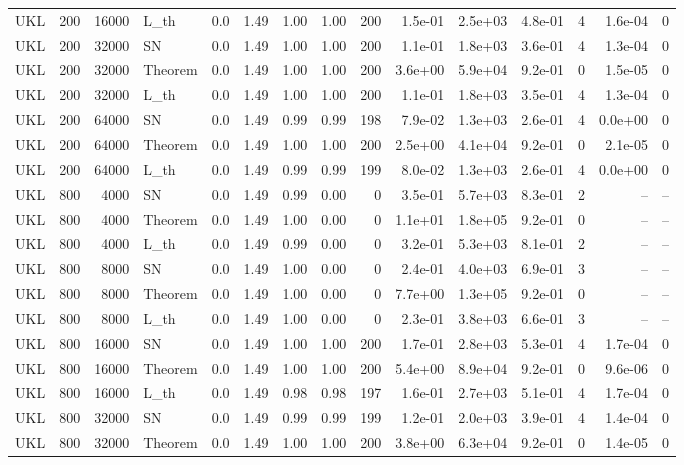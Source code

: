 \begin{tabular}{lrrlrrrrrrrrrrr}
UKL & 200 & 16000 & L\_th & 0.0 & 1.49 & 1.00 & 1.00 & 200 & 1.5e-01 & 2.5e+03 & 4.8e-01 & 4 & 1.6e-04 & 0 \\
UKL & 200 & 32000 & SN & 0.0 & 1.49 & 1.00 & 1.00 & 200 & 1.1e-01 & 1.8e+03 & 3.6e-01 & 4 & 1.3e-04 & 0 \\
UKL & 200 & 32000 & Theorem & 0.0 & 1.49 & 1.00 & 1.00 & 200 & 3.6e+00 & 5.9e+04 & 9.2e-01 & 0 & 1.5e-05 & 0 \\
UKL & 200 & 32000 & L\_th & 0.0 & 1.49 & 1.00 & 1.00 & 200 & 1.1e-01 & 1.8e+03 & 3.5e-01 & 4 & 1.3e-04 & 0 \\
UKL & 200 & 64000 & SN & 0.0 & 1.49 & 0.99 & 0.99 & 198 & 7.9e-02 & 1.3e+03 & 2.6e-01 & 4 & 0.0e+00 & 0 \\
UKL & 200 & 64000 & Theorem & 0.0 & 1.49 & 1.00 & 1.00 & 200 & 2.5e+00 & 4.1e+04 & 9.2e-01 & 0 & 2.1e-05 & 0 \\
UKL & 200 & 64000 & L\_th & 0.0 & 1.49 & 0.99 & 0.99 & 199 & 8.0e-02 & 1.3e+03 & 2.6e-01 & 4 & 0.0e+00 & 0 \\
UKL & 800 & 4000 & SN & 0.0 & 1.49 & 0.99 & 0.00 & 0 & 3.5e-01 & 5.7e+03 & 8.3e-01 & 2 & -- & -- \\
UKL & 800 & 4000 & Theorem & 0.0 & 1.49 & 1.00 & 0.00 & 0 & 1.1e+01 & 1.8e+05 & 9.2e-01 & 0 & -- & -- \\
UKL & 800 & 4000 & L\_th & 0.0 & 1.49 & 0.99 & 0.00 & 0 & 3.2e-01 & 5.3e+03 & 8.1e-01 & 2 & -- & -- \\
UKL & 800 & 8000 & SN & 0.0 & 1.49 & 1.00 & 0.00 & 0 & 2.4e-01 & 4.0e+03 & 6.9e-01 & 3 & -- & -- \\
UKL & 800 & 8000 & Theorem & 0.0 & 1.49 & 1.00 & 0.00 & 0 & 7.7e+00 & 1.3e+05 & 9.2e-01 & 0 & -- & -- \\
UKL & 800 & 8000 & L\_th & 0.0 & 1.49 & 1.00 & 0.00 & 0 & 2.3e-01 & 3.8e+03 & 6.6e-01 & 3 & -- & -- \\
UKL & 800 & 16000 & SN & 0.0 & 1.49 & 1.00 & 1.00 & 200 & 1.7e-01 & 2.8e+03 & 5.3e-01 & 4 & 1.7e-04 & 0 \\
UKL & 800 & 16000 & Theorem & 0.0 & 1.49 & 1.00 & 1.00 & 200 & 5.4e+00 & 8.9e+04 & 9.2e-01 & 0 & 9.6e-06 & 0 \\
UKL & 800 & 16000 & L\_th & 0.0 & 1.49 & 0.98 & 0.98 & 197 & 1.6e-01 & 2.7e+03 & 5.1e-01 & 4 & 1.7e-04 & 0 \\
UKL & 800 & 32000 & SN & 0.0 & 1.49 & 0.99 & 0.99 & 199 & 1.2e-01 & 2.0e+03 & 3.9e-01 & 4 & 1.4e-04 & 0 \\
UKL & 800 & 32000 & Theorem & 0.0 & 1.49 & 1.00 & 1.00 & 200 & 3.8e+00 & 6.3e+04 & 9.2e-01 & 0 & 1.4e-05 & 0 \\

\end{tabular}
